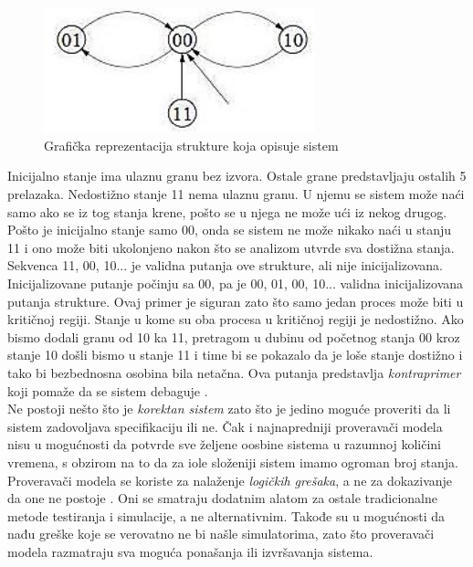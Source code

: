 \documentclass[a4paper]{article}
\begin{document}
\begin{figure}[h!]
\begin{center}
\includegraphics[width=0.7\textwidth]{slika}
\end{center}
\caption{Grafička reprezentacija strukture koja opisuje sistem}
\label{fig:slika}
\end{figure}

Inicijalno stanje ima ulaznu granu bez izvora. Ostale grane predstavljaju ostalih 5 prelazaka. Nedostižno stanje 11 nema ulaznu granu. U njemu se sistem može naći samo ako se iz tog stanja krene, pošto se u njega ne može ući iz nekog drugog. Pošto je inicijalno stanje samo 00, onda se sistem ne može nikako naći u stanju 11 i ono može biti ukolonjeno nakon što se analizom utvrde sva dostižna stanja. Sekvenca 11, 00, 10... je validna putanja ove strukture, ali nije inicijalizovana. Inicijalizovane putanje počinju sa 00, pa je 00, 01, 00, 10... validna inicijalizovana putanja strukture. 
Ovaj primer je siguran zato što samo jedan proces može biti u kritičnoj regiji. Stanje u kome su oba procesa u kritičnoj regiji je nedostižno. Ako bismo dodali granu od 10 ka 11, pretragom u dubinu od početnog stanja 00 kroz stanje 10 došli bismo u stanje 11 i time bi se pokazalo da je loše stanje dostižno i tako bi bezbednosna osobina bila netačna. Ova putanja predstavlja \textit{kontraprimer} koji pomaže da se sistem debaguje \cite{boundedMC}.  \\

Ne postoji nešto što je \textit{korektan sistem} zato što je jedino moguće proveriti da li sistem zadovoljava specifikaciju ili ne. Čak i najnapredniji proveravači modela nisu u mogućnosti da potvrde sve željene oosbine sistema u razumnoj količini vremena, s obzirom na to da za iole složeniji sistem imamo ogroman broj stanja. Proveravači modela se koriste za nalaženje \textit{logičkih grešaka}, a ne za dokazivanje da one ne postoje \cite{boundedMC}. Oni se smatraju dodatnim alatom za ostale tradicionalne metode testiranja i simulacije, a ne alternativnim. Takođe su u mogućnosti da nađu greške koje se verovatno ne bi našle simulatorima, zato što proveravači modela razmatraju sva moguća ponašanja ili izvršavanja sistema. \\ 
\end{document}
